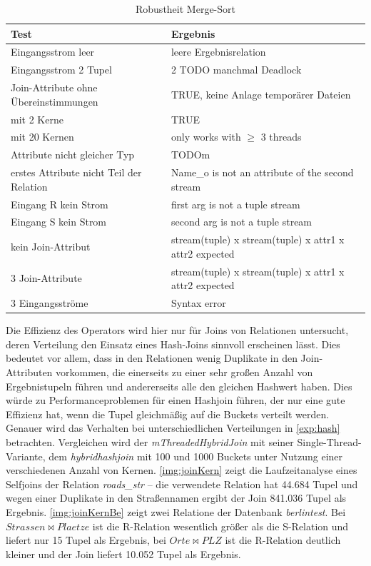 \documentclass[a4paper,12pt,twoside]{article}
\newcommand{\Fb}[1]{\textit{#1}} %
\begin{document}
\begin{table}
	\centering
	\begin{tabular}{|p{7.5cm}|p{7.5cm}|}
		\hline 
		Test & Ergebnis \\
		\hline
		Eingangsstrom leer & leere Ergebnisrelation \\ 
		\hline
		Eingangsstrom 2 Tupel & 2 TODO manchmal Deadlock \\ 
		\hline
		Join-Attribute ohne Übereinstimmungen & TRUE, keine Anlage temporärer Dateien \\
		\hline
		mit 2 Kerne & TRUE  \\
		\hline
		mit 20 Kernen & only works with $\geq$ 3 threads  \\ 
		\hline
		Attribute nicht gleicher Typ & TODOm \\ 
		\hline
		erstes Attribute nicht Teil der Relation & Name\_o is not an attribute of the second stream \\ 
		\hline
		Eingang R kein Strom & first arg is not a tuple stream \\ 
		\hline
		Eingang S kein Strom & second arg is not a tuple stream \\ 
		\hline
		kein Join-Attribut & stream(tuple) x stream(tuple) x attr1 x attr2 expected \\ 
		\hline
		3 Join-Attribute & stream(tuple) x stream(tuple) x attr1 x attr2 expected \\
		\hline
		3 Eingangsströme &  Syntax error \\
		\hline
	\end{tabular}
	\caption{\label{tab:testJoinRobust}Robustheit Merge-Sort}
\end{table}

Die Effizienz des Operators wird hier nur für Joins von Relationen untersucht, deren Verteilung den Einsatz eines Hash-Joins sinnvoll erscheinen lässt. Dies bedeutet vor allem, dass in den Relationen wenig Duplikate in den Join-Attributen vorkommen, die einerseits zu einer sehr großen Anzahl von Ergebnistupeln führen und andererseits alle den gleichen Hashwert haben. Dies würde zu Performanceproblemen für einen Hashjoin führen, der nur eine gute Effizienz hat, wenn die Tupel gleichmäßig auf die Buckets verteilt werden. Genauer wird das Verhalten bei unterschiedlichen Verteilungen in \autoref{exp:hash} betrachten. Vergleichen wird der \Fb{mThreadedHybridJoin} mit seiner Single-Thread-Variante, dem \Fb{hybridhashjoin} mit 100 und 1000 Buckets unter Nutzung einer verschiedenen Anzahl von Kernen. \autoref{img:joinKern} zeigt die Laufzeitanalyse eines Selfjoins der Relation \Fb{roads\_str} -- die verwendete Relation hat 44.684 Tupel und wegen einer Duplikate in den Straßennamen ergibt der Join 841.036 Tupel als Ergebnis. \autoref{img:joinKernBe} zeigt zwei Relatione der Datenbank \Fb{berlintest}. Bei $Strassen \bowtie Plaetze$ ist die R-Relation wesentlich größer als die S-Relation und liefert nur 15 Tupel als Ergebnis, bei $Orte \bowtie PLZ$ ist die R-Relation deutlich kleiner und der Join liefert 10.052 Tupel als Ergebnis.
\end{document}
